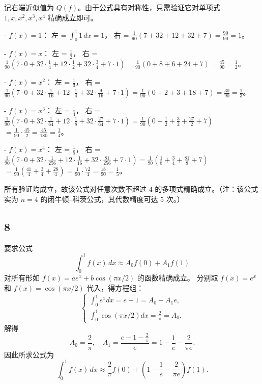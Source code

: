 \documentclass{article}
\begin{document}
记右端近似值为 \(Q(f)\)。由于公式具有对称性，只需验证它对单项式 \(1, x, x^2, x^3, x^4\) 精确成立即可。  

- \(f(x)=1\)：  
  左 = \(\int_0^1 1\,dx = 1\)，  
  右 = \(\frac{1}{90}(7+32+12+32+7) = \frac{90}{90}=1\)。  

- \(f(x)=x\)：  
  左 = \(\frac12\)，  
  右 = \(\frac{1}{90}\left(7\cdot0+32\cdot\frac14+12\cdot\frac12+32\cdot\frac34+7\cdot1\right) = \frac{1}{90}(0+8+6+24+7)=\frac{45}{90}=\frac12\)。  

- \(f(x)=x^2\)：  
  左 = \(\frac13\)，  
  右 = \(\frac{1}{90}\left(7\cdot0+32\cdot\frac1{16}+12\cdot\frac14+32\cdot\frac9{16}+7\cdot1\right) = \frac{1}{90}(0+2+3+18+7)=\frac{30}{90}=\frac13\)。  

- \(f(x)=x^3\)：  
  左 = \(\frac14\)，  
  右 = \(\frac{1}{90}\left(7\cdot0+32\cdot\frac1{64}+12\cdot\frac18+32\cdot\frac{27}{64}+7\cdot1\right) = \frac{1}{90}\left(0+\frac12+\frac32+\frac{27}{2}+7\right)\)  
  \(= \frac{1}{90}\cdot\frac{45}{2} = \frac{45}{180} = \frac14\)。  

- \(f(x)=x^4\)：  
  左 = \(\frac15\)，  
  右 = \(\frac{1}{90}\left(7\cdot0+32\cdot\frac1{256}+12\cdot\frac1{16}+32\cdot\frac{81}{256}+7\cdot1\right) = \frac{1}{90}\left(\frac18+\frac34+\frac{81}{8}+7\right)\)  
  \(= \frac{1}{90}\left(\frac{41}{4}+\frac34+\frac{28}{4}\right) = \frac{1}{90}\cdot\frac{72}{4} = \frac{18}{90} = \frac15\)。  

所有验证均成立，故该公式对任意次数不超过 \(4\) 的多项式精确成立。（注：该公式实为 \(n=4\) 的闭牛顿–科茨公式，其代数精度可达 \(5\) 次。）

\subsection*{8}

要求公式  
\[
\int_0^1 f(x)\,dx \approx A_0 f(0) + A_1 f(1)
\]  
对所有形如 \( f(x) = a e^x + b \cos(\pi x/2) \) 的函数精确成立。  
分别取 \( f(x) = e^x \) 和 \( f(x) = \cos(\pi x/2) \) 代入，得方程组：  
\[
\begin{cases}
\int_0^1 e^x dx = e-1 = A_0 + A_1 e, \\[4pt]
\int_0^1 \cos(\pi x/2) dx = \frac{2}{\pi} = A_0.
\end{cases}
\]  
解得  
\[
A_0 = \frac{2}{\pi}, \quad A_1 = \frac{e-1 - \frac{2}{\pi}}{e} = 1 - \frac{1}{e} - \frac{2}{\pi e}.
\]  
因此所求公式为  
\[
\int_0^1 f(x)\,dx \approx \frac{2}{\pi} f(0) + \left(1 - \frac{1}{e} - \frac{2}{\pi e}\right) f(1).
\]
\end{document}
